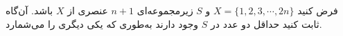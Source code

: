     \p 
فرض کنید
$X = \{1, 2, 3, \cdots, 2n\}$
و
$S$
زیرمجموعه‌ای
$n + 1$
عنصری از
$X$
باشد. آن‌گاه ثابت کنید حداقل دو عدد در
$S$
وجود دارند به‌طوری که یکی دیگری را می‌شمارد.